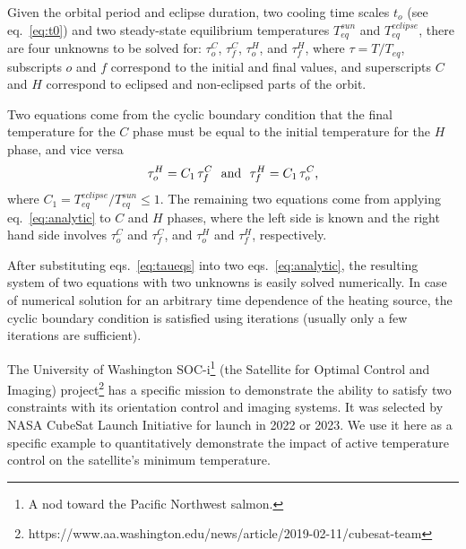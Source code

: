 \documentclass[]{aastex62}
\def\eq#1{\begin{equation} #1 \end{equation}}
\begin{document}
\vskip 0.2in

\vskip 0.1in
Given the orbital period and eclipse duration, two cooling time scales $t_o$ (see eq.~\ref{eq:t0}) and two 
steady-state equilibrium temperatures $T_{eq}^{sun}$ and $T_{eq}^{eclipse}$, there are four unknowns to 
be solved for: $\tau_o^C$, $\tau_f^C$, $\tau_o^H$, and $\tau_f^H$, where $\tau=T/T_{eq}$, subscripts 
$o$ and $f$ correspond to the initial and final values, and superscripts $C$ and $H$ correspond to 
eclipsed and non-eclipsed parts of the orbit. 
 
Two equations come from the cyclic boundary condition that the final temperature for the $C$ phase
must be equal to the initial temperature for the $H$ phase, and vice versa
\eq{
\label{eq:taueqs}
     \tau_o^H = C_1 \,\tau_f^C \,\,  \,\,   {\rm and} \,\, \,\,   \tau_f^H = C_1 \, \tau_o^C,
} 
where $C_1 =  T_{eq}^{eclipse}/T_{eq}^{sun} \le 1$. The remaining two equations come
from applying eq.~\ref{eq:analytic} to $C$ and $H$ phases, where the left side is known and the right
hand side involves $\tau_o^C$ and $\tau_f^C$, and $\tau_o^H$ and $\tau_f^H$, respectively. 

After substituting eqs.~\ref{eq:taueqs} into two eqs.~\ref{eq:analytic}, the resulting system of 
two equations with two unknowns is easily solved numerically.  In case of numerical solution
for an arbitrary time dependence of the heating source, the cyclic boundary condition is satisfied
using iterations (usually only a few iterations are sufficient). 

\newpage
{}

The University of Washington SOC-i\footnote{A nod toward the Pacific Northwest salmon.}  
(the Satellite for Optimal Control and Imaging)  project\footnote{https://www.aa.washington.edu/news/article/2019-02-11/cubesat-team}
has a specific mission to demonstrate the ability to satisfy two constraints with its orientation
control and imaging systems. It was selected by NASA CubeSat Launch Initiative for launch in
2022 or 2023. We use it here as a specific example to quantitatively demonstrate the impact
of active temperature control on the satellite's minimum temperature. 

\vskip 0.1in 
\end{document}
